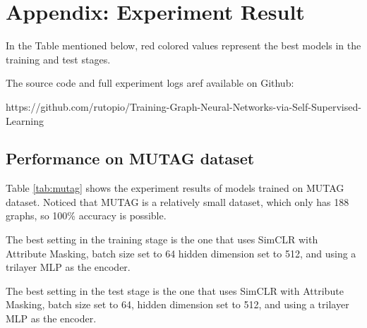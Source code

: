 
\section{Appendix: Experiment Result}

In the Table mentioned below, red colored values represent the best models in the training and test stages.

The source code and full experiment logs aref available on Github:

https://github.com/rutopio/Training-Graph-Neural-Networks-via-Self-Supervised-Learning


\subsection{Performance on MUTAG dataset}

Table \ref{tab:mutag} shows the experiment results of models trained on MUTAG dataset. Noticed that MUTAG is a relatively small dataset, which only has 188 graphs, so 100\% accuracy is possible. 

The best setting in the training stage is the one that uses SimCLR with Attribute Masking, batch size set to 64 hidden dimension set to 512, and using a trilayer MLP as the encoder.

The best setting in the test stage is the one that uses SimCLR with Attribute Masking, batch size set to 64, hidden dimension set to 512, and using a trilayer MLP as the encoder.




